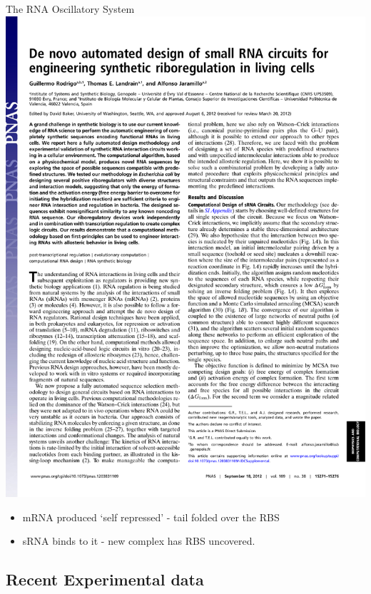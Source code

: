 \documentclass{beamer}
\begin{document}
\begin{frame}{The RNA Oscillatory System}{}
\includegraphics[trim = 130 600 30 30,page=4,clip = true]{../Figures/pnas1203831109.pdf}
  \begin{itemize}
    \item  mRNA produced `self repressed'  - tail folded over the RBS
    \item  sRNA binds to it - new complex has RBS uncovered.
    \end{itemize}
\end{frame}

\subsection{Recent Experimental data}
\end{document}
